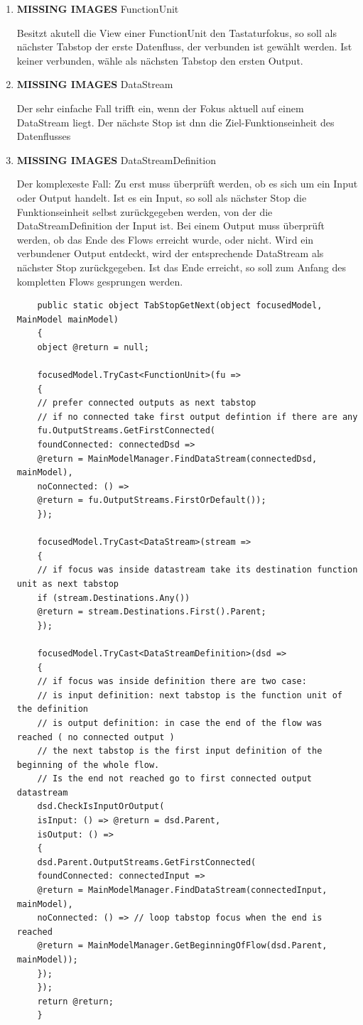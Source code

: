 \begin{enumerate}
	\item {\bfseries\sffamily MISSING IMAGES} FunctionUnit

	Besitzt akutell die View einer FunctionUnit den Tastaturfokus, so soll als
	nächster Tabstop der erste Datenfluss, der verbunden ist gewählt werden. Ist keiner
	verbunden, wähle als nächsten Tabstop den ersten Output.
	
	\item {\bfseries\sffamily MISSING IMAGES} DataStream

	Der sehr einfache Fall trifft ein, wenn der Fokus aktuell auf einem
	DataStream liegt. Der nächste Stop ist dnn die Ziel-Funktionseinheit des Datenflusses
	
	\item {\bfseries\sffamily MISSING IMAGES} DataStreamDefinition

	Der komplexeste Fall: 
	Zu erst muss überprüft werden, ob es sich um ein Input oder Output
	handelt. Ist es ein Input, so soll als nächster Stop die Funktionseinheit
	selbst zurückgegeben werden, von der die DataStreamDefinition der Input ist. 
	Bei einem Output muss überprüft werden, ob das Ende des Flows erreicht
	wurde, oder nicht. Wird ein verbundener Output entdeckt, wird der
	entsprechende DataStream als nächster Stop zurückgegeben. Ist das Ende
	erreicht, so soll zum Anfang des kompletten Flows gesprungen werden.
	
	\begin{verbatim}
	public static object TabStopGetNext(object focusedModel, MainModel mainModel)
	{
	object @return = null;
	
	focusedModel.TryCast<FunctionUnit>(fu =>
	{
	// prefer connected outputs as next tabstop
	// if no connected take first output defintion if there are any
	fu.OutputStreams.GetFirstConnected(
	foundConnected: connectedDsd => 
	@return = MainModelManager.FindDataStream(connectedDsd, mainModel),
	noConnected: () => 
	@return = fu.OutputStreams.FirstOrDefault());
	});
	
	focusedModel.TryCast<DataStream>(stream =>
	{
	// if focus was inside datastream take its destination function unit as next tabstop
	if (stream.Destinations.Any())
	@return = stream.Destinations.First().Parent;
	});
	
	focusedModel.TryCast<DataStreamDefinition>(dsd =>
	{
	// if focus was inside definition there are two case:
	// is input definition: next tabstop is the function unit of the definition
	// is output definition: in case the end of the flow was reached ( no connected output ) 
	// the next tabstop is the first input definition of the beginning of the whole flow.
	// Is the end not reached go to first connected output datastream
	dsd.CheckIsInputOrOutput( 
	isInput: () => @return = dsd.Parent,
	isOutput: () =>
	{
	dsd.Parent.OutputStreams.GetFirstConnected(
	foundConnected: connectedInput => 
	@return = MainModelManager.FindDataStream(connectedInput, mainModel),
	noConnected: () => // loop tabstop focus when the end is reached
	@return = MainModelManager.GetBeginningOfFlow(dsd.Parent, mainModel)); 
	});
	});
	return @return;
	}
	\end{verbatim}
	

\end{enumerate}
